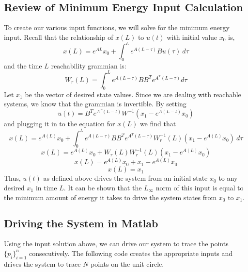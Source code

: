 \documentclass[12pt,letterpaper]{article}
\begin{document}
\subsection{Review of Minimum Energy Input Calculation}
To create our various input functions, we will solve for the minimum energy input. Recall that the relationship of $x(L)$ to $u(t)$ with initial value $x_{0}$ is,
\[ x(L) = e^{AL}x_{0} + \int_{0}^{L}e^{A(L-\tau)}Bu(\tau)\ d\tau \]
and the time $L$ reachability grammian is:
\[W_{r}(L)=\int _{0}^{L} e^{A(L-\tau)}BB^{T}e^{A^{T}(L-\tau)}d\tau \]
Let $x_{1}$ be the vector of desired state values. Since we are dealing with reachable systems, we know that the grammian is invertible. 
By setting 
\[u(t) = B^{T}e^{A^{T}(L-t)}W^{-1}(x_{1} - e^{A(L-t)}x_{0})\]
and plugging it in to the equation for $x(L)$ we find that
\[ x(L) = e^{A(L)}x_{0} + \int_{0}^{L}e^{A(L-\tau)}BB^{T}e^{A^{T}(L-\tau)}W_{r}^{-1}(L)(x_{1} - e^{A(L)}x_{0}) \ d\tau \]
\[ x(L) = e^{A(L)}x_{0} + W_{r}(L)W_{r}^{-1}(L)(x_{1} - e^{A(L)}x_{0}) \]
\[ x(L) = e^{A(L)}x_{0} + x_{1} - e^{A(L)}x_{0} \]
\[ x(L) = x_{1}\]
Thus, $u(t)$ as defined above drives the system from an initial state $x_{0}$ to any desired $x_{1}$ in time $L$. It can be shown that the $L_{\infty}$ norm of this input is equal to the minimum amount of energy it takes to drive the system states from $x_{0}$ to $x_{1}$.

\subsection{Driving the System in Matlab}
Using the input solution above, we can drive our system to trace the points $\{p_{i}\}_{i=1}^{n}$ consecutively. The following code creates the appropriate inputs and drives the system to trace $N$ points on the unit circle.
\end{document}
